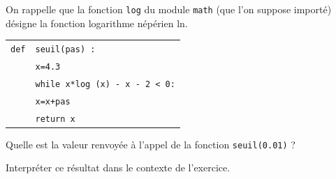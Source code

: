 \documentclass[10pt]{article}
\begin{document}
\begin{enumerate}
On rappelle que la fonction \texttt{log} du module \texttt{math} (que l'on suppose importé)
désigne la fonction logarithme népérien ln.

\begin{center}
\begin{tabular}{|l l|} \hline
\texttt{def}& \texttt{seuil(pas) :}\\
&\texttt{x=4.3}\\
&\texttt{while x*log (x) - x - 2 < 0:}\\
&\quad \texttt{x=x+pas}\\
&\texttt{return x}\\ \hline
\end{tabular}
\end{center}

Quelle est la valeur renvoyée à l'appel de la fonction \texttt{seuil(0.01)} ?

Interpréter ce résultat dans le contexte de l'exercice.
\end{enumerate}

\bigskip
\end{document}
